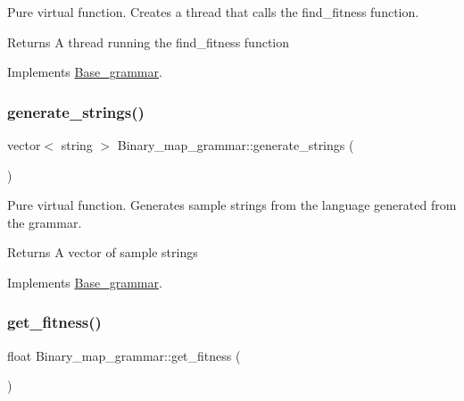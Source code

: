 Pure virtual function. Creates a thread that calls the find\+\_\+fitness function. 

\begin{DoxyReturn}{Returns}
A thread running the find\+\_\+fitness function 
\end{DoxyReturn}


Implements \mbox{\hyperlink{classBase__grammar_ae89dff40e2380073bfd9f8ca8f5579f7}{Base\+\_\+grammar}}.

\mbox{\label{classBinary__map__grammar_adf7b6f59466f209246cb5f816b9cb68d}} 
\subsubsection{\texorpdfstring{generate\_strings()}{generate\_strings()}}
{\footnotesize\ttfamily vector$<$ string $>$ Binary\+\_\+map\+\_\+grammar\+::generate\+\_\+strings (\begin{DoxyParamCaption}{ }\end{DoxyParamCaption})\hspace{0.3cm}{\ttfamily [virtual]}}



Pure virtual function. Generates sample strings from the language generated from the grammar. 

\begin{DoxyReturn}{Returns}
A vector of sample strings 
\end{DoxyReturn}


Implements \mbox{\hyperlink{classBase__grammar_a19197d28ad3c12d15cd97a8d10832dda}{Base\+\_\+grammar}}.

\mbox{\label{classBinary__map__grammar_a4576956993498f6935206bb70c40fda7}} 
\subsubsection{\texorpdfstring{get\_fitness()}{get\_fitness()}}
{\footnotesize\ttfamily float Binary\+\_\+map\+\_\+grammar\+::get\+\_\+fitness (\begin{DoxyParamCaption}{ }\end{DoxyParamCaption})\hspace{0.3cm}{\ttfamily [virtual]}}



